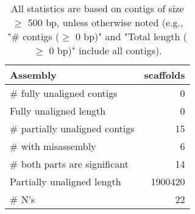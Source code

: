 \documentclass[12pt,a4paper]{article}
\begin{document}
\begin{table}[ht]
\begin{center}
\caption{All statistics are based on contigs of size $\geq$ 500 bp, unless otherwise noted (e.g., "\# contigs ($\geq$ 0 bp)" and "Total length ($\geq$ 0 bp)" include all contigs).}
\begin{tabular}{|l*{1}{|r}|}
\hline
Assembly & scaffolds \\ \hline
\# fully unaligned contigs & 0 \\ \hline
Fully unaligned length & 0 \\ \hline
\# partially unaligned contigs & 15 \\ \hline
\hspace{5mm}\# with misassembly & 6 \\ \hline
\hspace{5mm}\# both parts are significant & 14 \\ \hline
Partially unaligned length & 1900420 \\ \hline
\# N's & 22 \\ \hline
\end{tabular}
\end{center}
\end{table}
\end{document}
